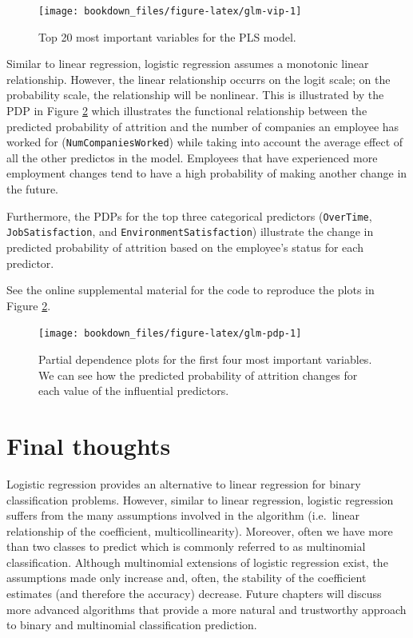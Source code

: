 \documentclass[]{krantz}
\makeatletter
\newenvironment{kframe}{%
\medskip{}
\setlength{\fboxsep}{.8em}
 \def\at@end@of@kframe{}%
 \ifinner\ifhmode%
  \def\at@end@of@kframe{\end{minipage}}%
  \begin{minipage}{\columnwidth}%
 \fi\fi%
 \def\FrameCommand##1{\hskip\@totalleftmargin \hskip-\fboxsep
 \colorbox{shadecolor}{##1}\hskip-\fboxsep
     \hskip-\linewidth \hskip-\@totalleftmargin \hskip\columnwidth}%
 \MakeFramed {\advance\hsize-\width
   \@totalleftmargin\z@ \linewidth\hsize
   \@setminipage}}%
 {\par\unskip\endMakeFramed%
 \at@end@of@kframe}
\newenvironment{block}[1]
  {
  \begin{itemize}
  \renewcommand{\labelitemi}{
    \raisebox{-.7\height}[0pt][0pt]{
      {\setkeys{Gin}{width=3em,keepaspectratio}\texttt{[image: icons/\#1]}}
    }
  }
  \setlength{\fboxsep}{1em}
  \begin{kframe}
  \item
  }
  {
  \end{kframe}
  \end{itemize}
  }
\newenvironment{tip}
  {\begin{block}{tip}}
  {\end{block}}
\makeatother
\begin{document}
\begin{figure}

{\centering \texttt{[image: bookdown\_files/figure-latex/glm-vip-1]} 

}

\caption{Top 20 most important variables for the PLS model.}\label{fig:glm-vip}
\end{figure}

Similar to linear regression, logistic regression assumes a monotonic linear relationship. However, the linear relationship occurrs on the logit scale; on the probability scale, the relationship will be nonlinear. This is illustrated by the PDP in Figure \ref{fig:glm-pdp} which illustrates the functional relationship between the predicted probability of attrition and the number of companies an employee has worked for (\texttt{NumCompaniesWorked}) while taking into account the average effect of all the other predictos in the model. Employees that have experienced more employment changes tend to have a high probability of making another change in the future.

Furthermore, the PDPs for the top three categorical predictors (\texttt{OverTime}, \texttt{JobSatisfaction}, and \texttt{EnvironmentSatisfaction}) illustrate the change in predicted probability of attrition based on the employee's status for each predictor.

\begin{tip}
See the online supplemental material for the code to reproduce the plots
in Figure \ref{fig:glm-pdp}.
\end{tip}

\begin{figure}

{\centering \texttt{[image: bookdown\_files/figure-latex/glm-pdp-1]} 

}

\caption{Partial dependence plots for the first four most important variables.  We can see how the predicted probability of attrition changes for each value of the influential predictors.}\label{fig:glm-pdp}
\end{figure}

\hypertarget{final-thoughts-1}{%
\section{Final thoughts}\label{final-thoughts-1}}

Logistic regression provides an alternative to linear regression for binary classification problems. However, similar to linear regression, logistic regression suffers from the many assumptions involved in the algorithm (i.e.~linear relationship of the coefficient, multicollinearity). Moreover, often we have more than two classes to predict which is commonly referred to as multinomial classification. Although multinomial extensions of logistic regression exist, the assumptions made only increase and, often, the stability of the coefficient estimates (and therefore the accuracy) decrease. Future chapters will discuss more advanced algorithms that provide a more natural and trustworthy approach to binary and multinomial classification prediction.



\backmatter
\printindex
\end{document}
